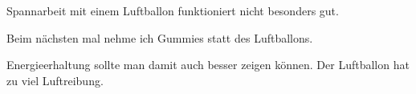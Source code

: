 Spannarbeit mit einem Luftballon funktioniert nicht besonders gut.

Beim nächsten mal nehme ich Gummies statt des Luftballons.

Energieerhaltung sollte man damit auch besser zeigen können. Der Luftballon hat zu viel Luftreibung.
